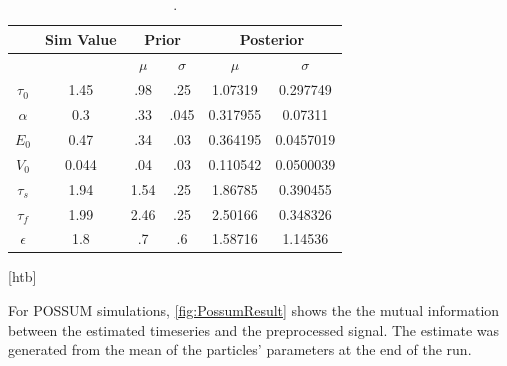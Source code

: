 \documentclass{article}
\begin{document}
\begin{table}[t]
\ninept
  \centering
\begin{tabular}{| c | c | c | c | c | c |}
\hline
& Sim Value & \multicolumn{2}{|c|}{Prior} &\multicolumn{2}{|c|}{Posterior} \\
\hline
        &       &$\mu$  & $\sigma$& $\mu$& $\sigma$\\
\hline
$\tau_0  $& 1.45  & .98   & .25     & 1.07319 & 0.297749  \\
\rowcolor[gray]{.8} 
$\alpha  $&0.3    & .33   & .045    & 0.317955& 0.07311  \\
$E_0     $& 0.47  & .34   & .03     & 0.364195& 0.0457019  \\
\rowcolor[gray]{.8} 
$V_0     $& 0.044 & .04   & .03     & 0.110542& 0.0500039  \\
$\tau_s  $& 1.94  & 1.54  & .25     & 1.86785 & 0.390455  \\
\rowcolor[gray]{.8} 
$\tau_f  $& 1.99  & 2.46  & .25     & 2.50166 & 0.348326  \\
$\epsilon$& 1.8   & .7    & .6      & 1.58716 & 1.14536  \\
\hline
\end{tabular}
  \caption{.}
\label{tab:long_corr}
\end{table}[htb]

For POSSUM simulations, \autoref{fig:PossumResult} shows the
the mutual information between the estimated timeseries and the 
preprocessed signal. The estimate was generated from the 
mean of the particles' parameters at the end of the run. 
\end{document}
